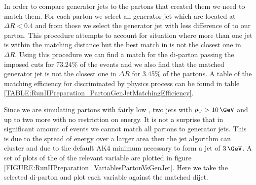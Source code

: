 In order to compare generator jets to the partons that created them we need to match them. For each parton we select all generator jet which are located at $\Delta R < 0.4$ and from those we select the generator jet with less difference of \pt to our parton. This procedure attempts to account for situation where more than one jet is within the matching distance but the best match in \pt is not the closest one in $\Delta R$. Using this procedure we can find a match for the di-parton passing the imposed cuts for 73.24\% of the events and we also find that the matched generator jet is not the closest one in $\Delta R$ for 3.45\% of the partons. A table of the matching efficiency for discriminated by physics process can be found in table \ref{TABLE:RunIIPreparation_PartonGenJetMatchingEfficiency}. 



Since we are simulating partons with fairly low \pt, two jets with $\pt > 10\,\GeV$ and up to two more with no restriction on energy. It is not a surprise that in significant amount of events we cannot match all partons to generator jets. This is due to the spread of energy over a larger area then the jet algorithm can cluster and due to the default AK4 minimum \pt necessary to form a jet of $3\,\GeV$. A set of plots of the of the relevant variable are plotted in figure \ref{FIGURE:RunIIPreparation_VariablesPartonVsGenJet}. Here we take the selected di-parton and plot each variable against the matched dijet.


